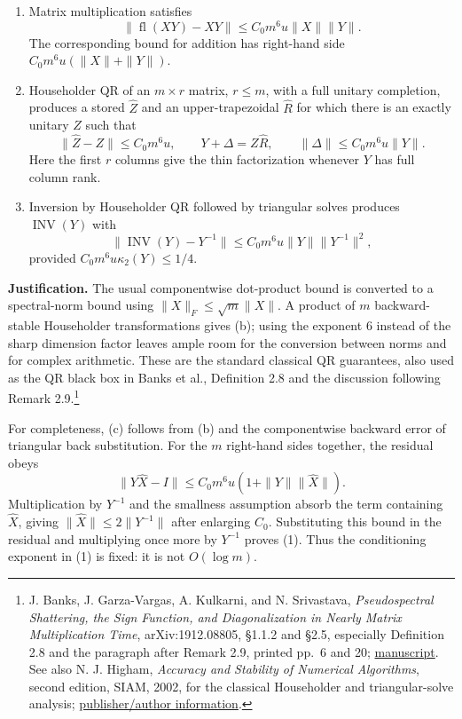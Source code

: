 \documentclass[10pt,a4paper]{article}
\begin{document}
\begin{enumerate}
\def\labelenumi{(\alph{enumi})}
\item
  Matrix multiplication satisfies \[
   \|\operatorname{fl}(XY)-XY\|\le C_0m^6u\|X\|\|Y\|.
  \] The corresponding bound for addition has right-hand side
  \(C_0m^6u(\|X\|+\|Y\|)\).
\item
  Householder QR of an \(m\times r\) matrix, \(r\le m\), with a full
  unitary completion, produces a stored \(\widehat Z\) and an
  upper-trapezoidal \(\widehat R\) for which there is an exactly unitary
  \(Z\) such that \[
   \|\widehat Z-Z\|\le C_0m^6u,
   \qquad Y+\Delta=Z\widehat R,
   \qquad \|\Delta\|\le C_0m^6u\|Y\|.
  \] Here the first \(r\) columns give the thin factorization whenever
  \(Y\) has full column rank.
\item
  Inversion by Householder QR followed by triangular solves produces
  \(\operatorname{INV}(Y)\) with \[
   \|\operatorname{INV}(Y)-Y^{-1}\|
   \le C_0m^6u\|Y\|\|Y^{-1}\|^2,
   \tag{1}
  \] provided \(C_0m^6u\kappa_2(Y)\le1/4\).
\end{enumerate}

\textbf{Justification.} The usual componentwise dot-product bound is
converted to a spectral-norm bound using \(\|X\|_F\le\sqrt m\|X\|\). A
product of \(m\) backward-stable Householder transformations gives (b);
using the exponent \(6\) instead of the sharp dimension factor leaves
ample room for the conversion between norms and for complex arithmetic.
These are the standard classical QR guarantees, also used as the QR
black box in Banks et al., Definition 2.8 and the discussion following
Remark 2.9.\footnote{J. Banks, J. Garza-Vargas, A. Kulkarni, and N.
  Srivastava, \emph{Pseudospectral Shattering, the Sign Function, and
  Diagonalization in Nearly Matrix Multiplication Time},
  arXiv:1912.08805, §1.1.2 and §2.5, especially Definition 2.8 and the
  paragraph after Remark 2.9, printed pp.~6 and 20;
  \href{https://arxiv.org/pdf/1912.08805}{manuscript}. See also N. J.
  Higham, \emph{Accuracy and Stability of Numerical Algorithms}, second
  edition, SIAM, 2002, for the classical Householder and
  triangular-solve analysis;
  \href{https://nhigham.com/accuracy-and-stability-of-numerical-algorithms/}{publisher/author
  information}.}

For completeness, (c) follows from (b) and the componentwise backward
error of triangular back substitution. For the \(m\) right-hand sides
together, the residual obeys \[
 \|Y\widehat X-I\|
 \le C_0m^6u(1+\|Y\|\|\widehat X\|).
\] Multiplication by \(Y^{-1}\) and the smallness assumption absorb the
term containing \(\widehat X\), giving \(\|\widehat X\|\le2\|Y^{-1}\|\)
after enlarging \(C_0\). Substituting this bound in the residual and
multiplying once more by \(Y^{-1}\) proves (1). Thus the conditioning
exponent in (1) is fixed: it is not \(O(\log m)\).
\end{document}
